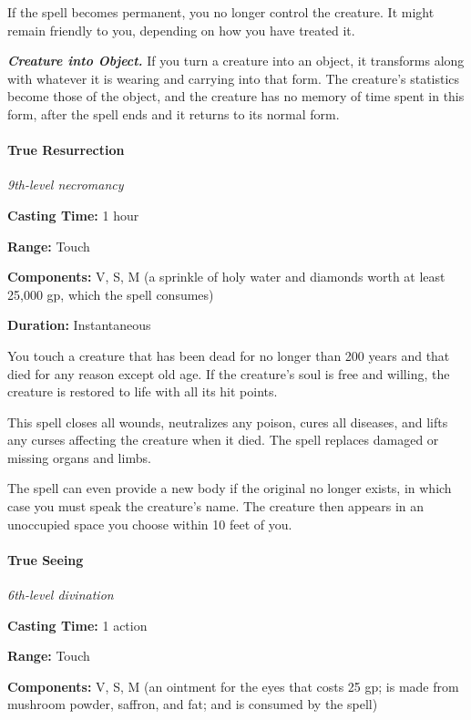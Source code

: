 \documentclass[
]{article}
\begin{document}
If the spell becomes permanent, you no longer control the creature. It
might remain friendly to you, depending on how you have treated it.

\emph{\textbf{Creature into Object.}} If you turn a creature into an
object, it transforms along with whatever it is wearing and carrying
into that form. The creature's statistics become those of the object,
and the creature has no memory of time spent in this form, after the
spell ends and it returns to its normal form.

\hypertarget{true-resurrection}{%
\paragraph{True Resurrection}\label{true-resurrection}}

\emph{9th-level necromancy}

\textbf{Casting Time:} 1 hour

\textbf{Range:} Touch

\textbf{Components:} V, S, M (a sprinkle of holy water and diamonds
worth at least 25,000 gp, which the spell consumes)

\textbf{Duration:} Instantaneous

You touch a creature that has been dead for no longer than 200 years and
that died for any reason except old age. If the creature's soul is free
and willing, the creature is restored to life with all its hit points.

This spell closes all wounds, neutralizes any poison, cures all
diseases, and lifts any curses affecting the creature when it died. The
spell replaces damaged or missing organs and limbs.

The spell can even provide a new body if the original no longer exists,
in which case you must speak the creature's name. The creature then
appears in an unoccupied space you choose within 10 feet of you.

\hypertarget{true-seeing}{%
\paragraph{True Seeing}\label{true-seeing}}

\emph{6th-level divination}

\textbf{Casting Time:} 1 action

\textbf{Range:} Touch

\textbf{Components:} V, S, M (an ointment for the eyes that costs 25 gp;
is made from mushroom powder, saffron, and fat; and is consumed by the
spell)
\end{document}
